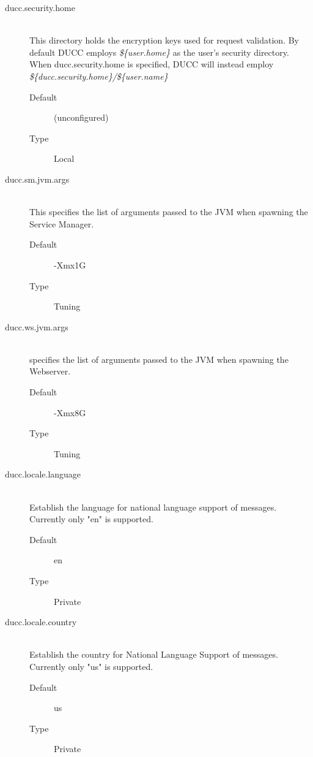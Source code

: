 \begin{description}
       \item[ducc.security.home] \hfill \\
         This directory holds the encryption keys used for request validation.
         By default DUCC employs {\em \$\{user.home\}} as the user's security directory.
         When ducc.security.home is specified, DUCC will instead employ {\em \$\{ducc.security.home\}/\$\{user.name\}}
         \begin{description}
           \item[Default] (unconfigured) 
           \item[Type] Local
         \end{description}

       \item[ducc.sm.jvm.args] \hfill \\
         This specifies the list of arguments passed to the JVM when spawning the Service Manager. 
         \begin{description}
           \item[Default] -Xmx1G 
           \item[Type] Tuning 
         \end{description}

       \item[ducc.ws.jvm.args] \hfill \\
         specifies the list of arguments passed to the JVM when spawning the
         Webserver.
         \begin{description}
           \item[Default] -Xmx8G 
           \item[Type] Tuning 
         \end{description}

       \item[ducc.locale.language] \hfill \\
         Establish the language for national language support of messages. Currently only "en" is 
         supported. 
         \begin{description}
           \item[Default] en 
           \item[Type] Private 
         \end{description}
           
       \item[ducc.locale.country] \hfill \\
         Establish the country for National Language Support of messages. Currently only "us" is 
         supported. 
         \begin{description}
           \item[Default] us 
           \item[Type] Private 
         \end{description}



\end{description}
